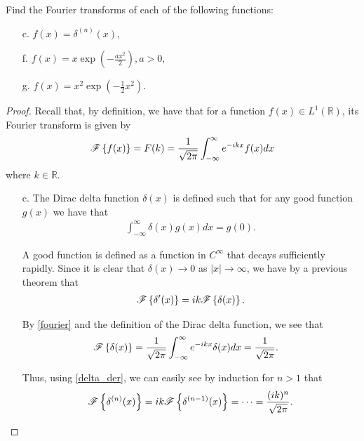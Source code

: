 \begin{problem}{2.1}
  Find the Fourier transforms of each of the following functions:
  \begin{enumerate}
    \item [c.] $f(x) = \delta ^{(n)}(x),$
    \item [f.] $\displaystyle f(x) = x \exp \left( -\frac{a x^2}{2} \right), a > 0,$
    \item [g.] $\displaystyle f(x) = x^2 \exp \left( -\frac{1}{2}x^2 \right).$
  \end{enumerate}
\end{problem}

\begin{proof}
  Recall that, by definition, we have that for a function $f(x) \in L^1(\mathbb{R})$,
  its Fourier transform is given by
  \begin{align}\label{fourier}
    \mathscr{F}\left\{ {f(x)} \right\} = F(k) = \frac{1}{\sqrt{2 \pi}} \int_{-\infty}^{\infty} e^{-ikx}f(x) dx
  \end{align}
  where $k\in\mathbb{R}$.

  \begin{enumerate}
    \item [c.] The Dirac delta function $\delta(x)$ is defined such that for any good function $g(x)$ we have that
      \begin{align*}
        \int_{-\infty}^{\infty} \delta(x) g(x) dx = g(0).
      \end{align*}

      A good function is defined as a function in $C^{\infty}$ that decays sufficiently rapidly.
      Since it is clear that $\delta(x) \to 0$ as $|x| \to \infty$, we have by a previous theorem that
      \begin{align}\label{delta_der}
        \mathscr{F}\left\{ {\delta'(x)} \right\} = ik \mathscr{F}\left\{ {\delta(x)} \right\}.
      \end{align}

      By \eqref{fourier} and the definition of the Dirac delta function, we see that
      \begin{align*}
        \mathscr{F}\left\{ {\delta(x)} \right\} &= \frac{1}{\sqrt{2\pi}}\int_{-\infty}^{\infty} e^{- i k x}\delta(x) dx = \frac{1}{\sqrt{2\pi}}.
      \end{align*}

      Thus, using \eqref{delta_der}, we can easily see by induction for $n > 1$ that
      \begin{align*}
        \mathscr{F}\left\{ {\delta^{(n)}(x)} \right\} = ik \mathscr{F}\left\{ {\delta^{(n-1)}(x)} \right\} = \dots = \frac{(ik)^n}{\sqrt{2 \pi}}.
      \end{align*}


\end{enumerate}
\end{proof}
